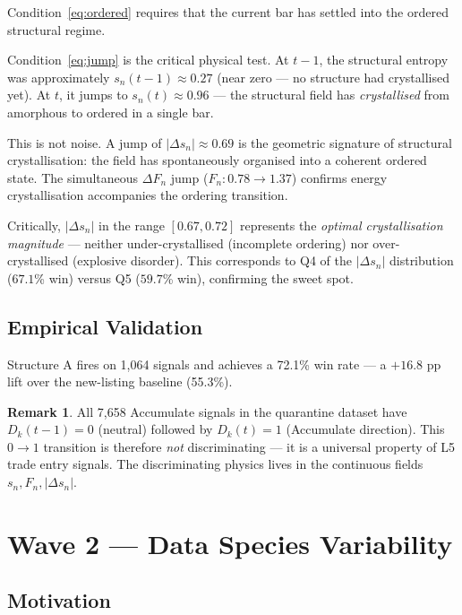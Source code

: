 \documentclass[11pt, a4paper]{article}
\newcommand{\Fn}{F_n}
\newcommand{\sn}{s_n}
\newcommand{\Dk}{D_k}
\newcommand{\dsn}{|\Delta s_n|}
\newcommand{\dFn}{\Delta F_n}
\theoremstyle{definition}
\newtheorem{remark}{Remark}
\begin{document}
Condition~\eqref{eq:ordered} requires that the current bar has settled into the
ordered structural regime.

Condition~\eqref{eq:jump} is the critical physical test.
At $t - 1$, the structural entropy was approximately $\sn(t-1) \approx 0.27$
(near zero — no structure had crystallised yet).
At $t$, it jumps to $\sn(t) \approx 0.96$ — the structural field has
\emph{crystallised} from amorphous to ordered in a single bar.

This is not noise.
A jump of $\dsn \approx 0.69$ is the geometric signature of structural
crystallisation: the field has spontaneously organised into a coherent
ordered state.
The simultaneous $\dFn$ jump ($F_n: 0.78 \to 1.37$) confirms energy
crystallisation accompanies the ordering transition.

Critically, $\dsn$ in the range $[0.67, 0.72]$ represents the
\emph{optimal crystallisation magnitude} — neither under-crystallised
(incomplete ordering) nor over-crystallised (explosive disorder).
This corresponds to Q4 of the $\dsn$ distribution ($67.1$\% win) versus
Q5 ($59.7$\% win), confirming the sweet spot.

\subsection{Empirical Validation}

Structure A fires on 1{,}064 signals and achieves a 72.1\% win rate —
a $+16.8$ pp lift over the new-listing baseline (55.3\%).

\begin{remark}
All 7{,}658 Accumulate signals in the quarantine dataset have $\Dk(t-1) = 0$
(neutral) followed by $\Dk(t) = 1$ (Accumulate direction).
This $0 \to 1$ transition is therefore \emph{not} discriminating — it is a
universal property of L5 trade entry signals.
The discriminating physics lives in the continuous fields $\sn, \Fn, \dsn$.
\end{remark}

\section{Wave 2 — Data Species Variability}

\subsection{Motivation}
\end{document}
